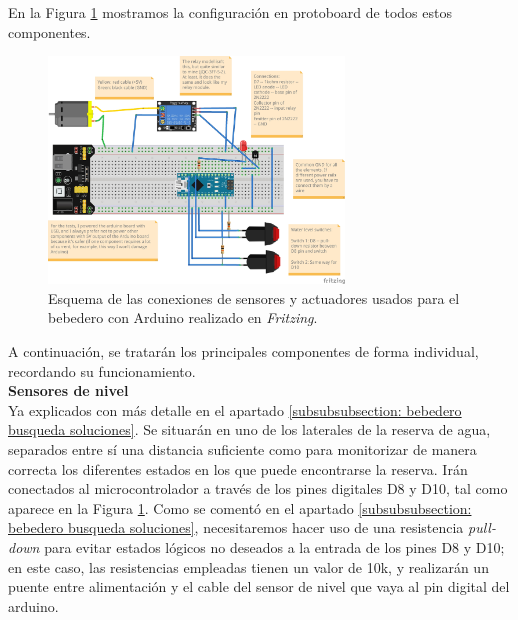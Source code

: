 \documentclass[12pt]{article}
\begin{document}
	\noindent En la Figura \ref{Esquema conexiones bebedero Fritzing} mostramos la configuración en protoboard de todos estos componentes.
	
	\pagebreak
	
	\begin{figure}[h]
		\begin{center}
			\includegraphics[width=0.7\textwidth]{img/bebedero_test_fritzing.jpg}
			\caption{Esquema de las conexiones de sensores y actuadores usados para el bebedero con Arduino realizado en \textit{Fritzing}.}
			\label{Esquema conexiones bebedero Fritzing}
		\end{center}
	\end{figure}

	\noindent A continuación, se tratarán los principales componentes de forma individual, recordando su funcionamiento. \\
	
	\noindent \textbf{Sensores de nivel}\\
	
	\noindent Ya explicados con más detalle en el apartado \ref{subsubsubsection: bebedero busqueda soluciones}. Se situarán en uno de los laterales de la reserva de agua, separados entre sí una distancia suficiente como para monitorizar de manera correcta los diferentes estados en los que puede encontrarse la reserva. Irán conectados al microcontrolador a través de los pines digitales D8 y D10, tal como aparece en la Figura \ref{Esquema conexiones bebedero Fritzing}. Como se comentó en el apartado \ref{subsubsubsection: bebedero busqueda soluciones}, necesitaremos hacer uso de una resistencia \textit{pull-down} para evitar estados lógicos no deseados a la entrada de los pines D8 y D10; en este caso, las resistencias empleadas tienen un valor de 10k, y realizarán un puente entre alimentación y el cable del sensor de nivel que vaya al pin digital del arduino.
	
\end{document}
